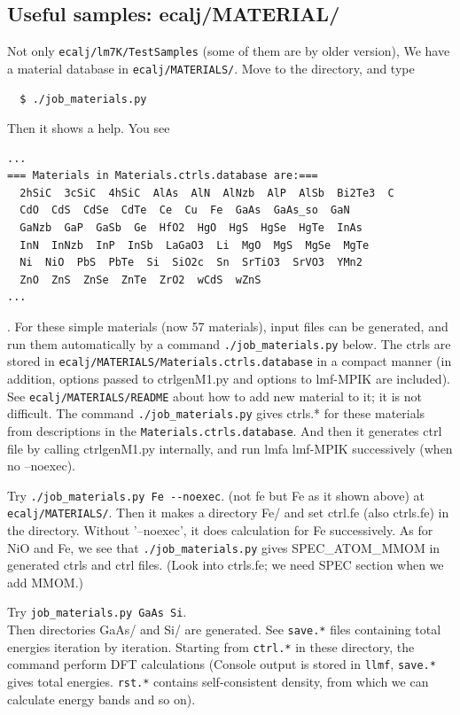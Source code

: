 \subsection{Useful samples: ecalj/MATERIAL/}
Not only \verb+ecalj/lm7K/TestSamples+ (some of them are by older version),
We have a material database in \verb+ecalj/MATERIALS/+. 
Move to the directory, and type  
\begin{verbatim}
  $ ./job_materials.py
\end{verbatim}
Then it shows a help. You see 
\begin{verbatim}
...
=== Materials in Materials.ctrls.database are:===
  2hSiC  3cSiC  4hSiC  AlAs  AlN  AlNzb  AlP  AlSb  Bi2Te3  C
  CdO  CdS  CdSe  CdTe  Ce  Cu  Fe  GaAs  GaAs_so  GaN
  GaNzb  GaP  GaSb  Ge  HfO2  HgO  HgS  HgSe  HgTe  InAs
  InN  InNzb  InP  InSb  LaGaO3  Li  MgO  MgS  MgSe  MgTe
  Ni  NiO  PbS  PbTe  Si  SiO2c  Sn  SrTiO3  SrVO3  YMn2
  ZnO  ZnS  ZnSe  ZnTe  ZrO2  wCdS  wZnS
...
\end{verbatim}
. For these simple materials (now 57 materials), input files can be generated,
and run them automatically by a command \verb+./job_materials.py+ below.
The ctrls are stored in \verb+ecalj/MATERIALS/Materials.ctrls.database+
in a compact manner
(in addition, options passed to ctrlgenM1.py and options to lmf-MPIK are
included). See \verb+ecalj/MATERIALS/README+ about how to add new
material to it; it is not difficult. 
The command \verb+./job_materials.py+ gives ctrls.* for these materials
from descriptions in the \verb+Materials.ctrls.database+.
And then it generates ctrl file by calling ctrlgenM1.py internally, 
and run lmfa lmf-MPIK successively (when no --noexec).

Try \verb+./job_materials.py Fe --noexec+. (not fe but Fe as it shown above)
at \verb+ecalj/MATERIALS/+. 
Then it makes a directory Fe/ and set ctrl.fe (also ctrls.fe) in the
directory. Without '--noexec', it does calculation for Fe successively.
As for NiO and Fe, we see that \verb+./job_materials.py+ gives
SPEC\_ATOM\_MMOM in generated ctrls and ctrl files.
(Look into ctrls.fe; we need SPEC section when we add MMOM.)

Try \verb+job_materials.py GaAs Si+.\\
Then directories GaAs/ and Si/ are generated. See \verb+save.*+ files containing
total energies iteration by iteration. Starting from \verb+ctrl.*+ in
these directory, the command perform DFT calculations 
(Console output is stored in \verb+llmf+, \verb+save.*+ gives
total energies. \verb+rst.*+ contains self-consistent
density, from which we can calculate energy bands and so on).

